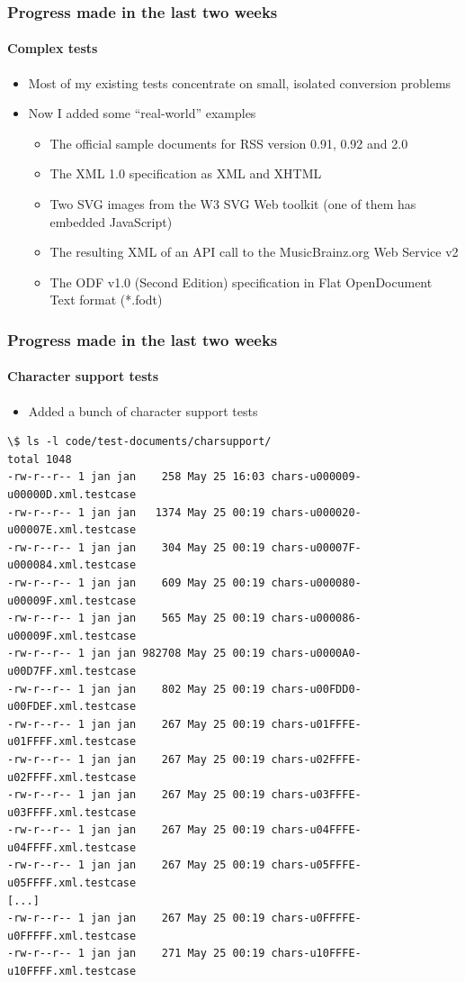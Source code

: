 \documentclass[
    alternativetitlepage=alternativ,
    cornerlogo=hgi_nds_logo2,
    sectionoverview,
]{rubpresentation}
\begin{document}
\begin{frame}[fragile]
    \frametitle{Progress made in the last two weeks}
    \framesubtitle{Complex tests}
    \begin{itemize}
        \item{} Most of my existing tests concentrate on small, isolated conversion problems
        \item{} Now I added some \enquote{real-world} examples
        \begin{itemize}
            \item{} The official sample documents for RSS version 0.91, 0.92 and 2.0
            \item{} The XML 1.0 specification as XML and XHTML
            \item{} Two SVG images from the W3 SVG Web toolkit (one of them has embedded JavaScript)
            \item{} The resulting XML of an API call to the MusicBrainz.org Web Service v2
            \item{} The ODF v1.0 (Second Edition) specification in Flat OpenDocument Text format (*.fodt)
        \end{itemize}
    \end{itemize}
\end{frame}

\begin{frame}[fragile]
    \frametitle{Progress made in the last two weeks}
    \framesubtitle{Character support tests}
    \begin{itemize}
        \item{} Added a bunch of character support tests
    \end{itemize}
    \begin{lstlisting}[basicstyle=\fontsize{7}{11}\ttfamily,numbers=none]
\$ ls -l code/test-documents/charsupport/
total 1048
-rw-r--r-- 1 jan jan    258 May 25 16:03 chars-u000009-u00000D.xml.testcase
-rw-r--r-- 1 jan jan   1374 May 25 00:19 chars-u000020-u00007E.xml.testcase
-rw-r--r-- 1 jan jan    304 May 25 00:19 chars-u00007F-u000084.xml.testcase
-rw-r--r-- 1 jan jan    609 May 25 00:19 chars-u000080-u00009F.xml.testcase
-rw-r--r-- 1 jan jan    565 May 25 00:19 chars-u000086-u00009F.xml.testcase
-rw-r--r-- 1 jan jan 982708 May 25 00:19 chars-u0000A0-u00D7FF.xml.testcase
-rw-r--r-- 1 jan jan    802 May 25 00:19 chars-u00FDD0-u00FDEF.xml.testcase
-rw-r--r-- 1 jan jan    267 May 25 00:19 chars-u01FFFE-u01FFFF.xml.testcase
-rw-r--r-- 1 jan jan    267 May 25 00:19 chars-u02FFFE-u02FFFF.xml.testcase
-rw-r--r-- 1 jan jan    267 May 25 00:19 chars-u03FFFE-u03FFFF.xml.testcase
-rw-r--r-- 1 jan jan    267 May 25 00:19 chars-u04FFFE-u04FFFF.xml.testcase
-rw-r--r-- 1 jan jan    267 May 25 00:19 chars-u05FFFE-u05FFFF.xml.testcase
[...]
-rw-r--r-- 1 jan jan    267 May 25 00:19 chars-u0FFFFE-u0FFFFF.xml.testcase
-rw-r--r-- 1 jan jan    271 May 25 00:19 chars-u10FFFE-u10FFFF.xml.testcase
    \end{lstlisting}
\end{frame}
\end{document}
